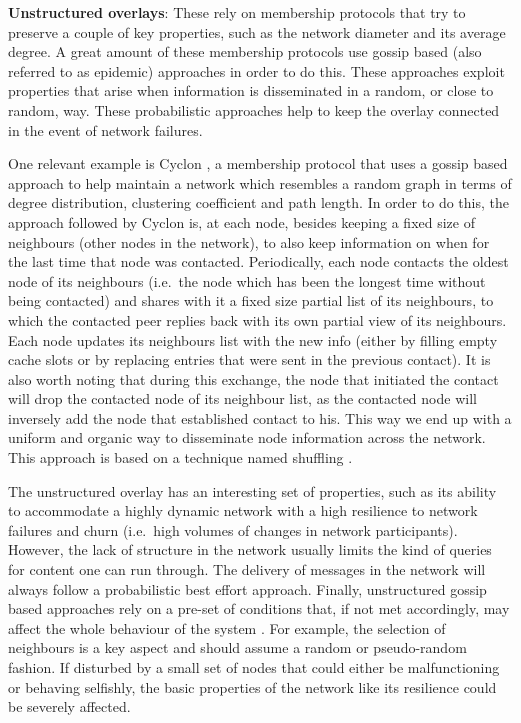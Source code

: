 \textbf{Unstructured overlays}: These rely on membership protocols that
try to preserve a couple of key properties, such as the network diameter
and its average degree. A great amount of these membership protocols use
gossip based (also referred to as epidemic) approaches in order to do
this. These approaches exploit properties that arise when information is
disseminated in a random, or close to random, way. These probabilistic
approaches help to keep the overlay connected in the event of network
failures.

One relevant example is Cyclon \cite{Voulgaris2005a}, a membership
protocol that uses a gossip based approach to help maintain a network
which resembles a random graph in
terms of degree distribution, clustering coefficient and path length. In
order to do this, the approach followed by Cyclon is, at each node,
besides keeping a fixed size of neighbours (other nodes in the network),
to also keep information on when for the last time that node was
contacted. Periodically, each node contacts the oldest node of its
neighbours (i.e.~the node which has been the longest time without being
contacted) and shares with it a fixed size partial list of its
neighbours, to which the contacted peer replies back with its own
partial view of its neighbours. Each node updates its neighbours list
with the new info (either by filling empty cache slots or by replacing
entries that were sent in the previous contact). It is also worth noting
that during this exchange, the node that initiated the contact will drop
the contacted node of its neighbour list, as the contacted node will
inversely add the node that established contact to his. This way we end
up with a uniform and organic way to disseminate node information across
the network. This approach is based on a technique named shuffling \cite{Stavrou2002}.

The unstructured overlay has an interesting set of properties, such as
its ability to accommodate a highly dynamic network with a high
resilience to network failures and churn (i.e.~high volumes of changes
in network participants). However, the lack of structure in the network
usually limits the kind of queries for content one can run through. The
delivery of messages in the network will always follow a probabilistic
best effort approach. Finally, unstructured gossip based approaches rely
on a pre-set of conditions that, if not met accordingly, may affect the
whole behaviour of the system \cite{Alvisi2007}. For example, the selection of
neighbours is a key aspect and should assume a random or pseudo-random
fashion. If disturbed by a small set of nodes that could either be
malfunctioning or behaving selfishly, the basic properties of the
network like its resilience could be severely affected.
\bigskip


